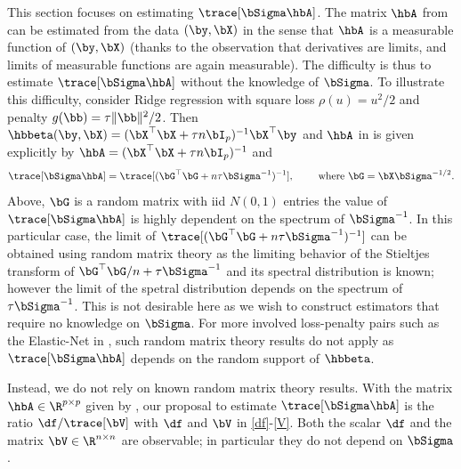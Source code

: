 \documentclass{colt2022} %
\numberwithin{equation}{section}
\begin{document}
This section focuses on estimating $\trace[\bSigma\hbA]$.
The matrix $\hbA$ from 
can be estimated from the data $(\by,\bX)$ in the sense
that $\hbA$ is a measurable function of $(\by,\bX)$
(thanks to the observation that derivatives are limits,
and limits of measurable functions are again measurable).
The difficulty is thus to estimate $\trace[\bSigma\hbA]$
without the knowledge of $\bSigma$. To illustrate this difficulty,
consider Ridge regression with square loss
$\rho(u)=u^2/2$ and penalty $g(\bb)=\tau\|\bb\|^2/2$.
Then 
$\hbbeta(\by,\bX) = (\bX^\top\bX + \tau n \bI_p)^{-1}\bX^\top\by$
and $\hbA$ in 
is given explicitly by $\hbA= (\bX^\top\bX + \tau n \bI_p)^{-1}$ and
$$\trace[\bSigma\hbA] = \trace[(\bG^\top\bG + n\tau \bSigma^{-1})^{-1}],
\qquad
\text{ where }
\bG=\bX\bSigma^{-1/2}.$$
Above, $\bG$ is a random matrix with iid $N(0,1)$ entries
the value of $\trace[\bSigma\hbA]$ is
highly dependent on the spectrum of $\bSigma^{-1}$.
In this particular case, the limit
of $\trace[(\bG^\top\bG + n\tau \bSigma^{-1})^{-1}]$
can be obtained using random matrix theory \citep{marvcenko1967distribution}
as the limiting behavior of the Stieltjes transform of 
$\bG^\top\bG/n + \tau\bSigma^{-1}$ and its spectral distribution is known;
however the limit of the spetral distribution 
depends on the spectrum of $\tau\bSigma^{-1}$.
This is not desirable here as we wish to construct estimators that 
require no knowledge on $\bSigma$.
For more involved loss-penalty pairs such as the
Elastic-Net in ,
such random matrix theory results do not apply 
as $\trace[\bSigma\hbA]$ depends on the random support of
$\hbbeta$. 

Instead, we do not rely on known
random matrix theory results.
With the matrix $\hbA\in\R^{p\times p}$
given by ,
our proposal to estimate
$\trace[\bSigma\hbA]$ is the ratio $\df/\trace[\bV]$
with $\df$ and $\bV$ in \eqref{df}-\eqref{V}.
Both the scalar $\df$ and the matrix $\bV\in\R^{n\times n}$
are observable; in particular they do not depend on $\bSigma$.
\end{document}
